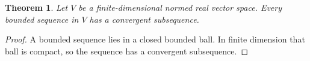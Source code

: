 \documentclass{article}
\newtheorem{theorem}{Theorem}
\begin{document}
\begin{theorem}\label{thm:finite-dimensional-subsequence-clean}
Let $V$ be a finite-dimensional normed real vector space. Every bounded sequence in $V$ has a convergent subsequence.
\end{theorem}
\begin{proof}
A bounded sequence lies in a closed bounded ball. In finite dimension that ball is compact, so the sequence has a convergent subsequence.
\end{proof}
\end{document}
